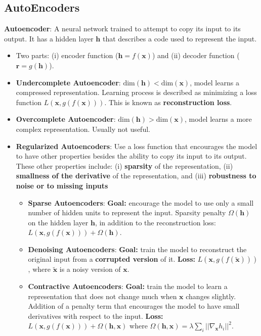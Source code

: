 \subsection*{AutoEncoders}
    \textbf{Autoencoder}: A neural network trained to attempt to copy its input to its output. It has a hidden layer $\mathbf{h}$ that describes a code used to represent the input.
\begin{itemize}
  \item Two parts: (i) encoder function ($\mathbf{h} = f(\mathbf{x})$) and (ii) decoder function ($\mathbf{r} = g(\mathbf{h})$).
  \item \textbf{Undercomplete Autoencoder}: $\text{dim}(\mathbf{h}) < \text{dim}(\mathbf{x})$, model learns a compressed representation. Learning process is described as minimizing a loss function $L(\mathbf{x}, g(f(\mathbf{x})))$. This is known as \textbf{reconstruction loss}.
  \item \textbf{Overcomplete Autoencoder}: $\text{dim}(\mathbf{h}) > \text{dim}(\mathbf{x})$, model learns a more complex representation. Usually not useful.
  \item \textbf{Regularized Autoencoders}: Use a loss function that encourages the model to have other properties besides the ability to copy its input to its output. These other properties include: (i) \textbf{sparsity} of the representation, (ii) \textbf{smallness of the derivative} of the representation, and (iii) \textbf{robustness to noise or to missing inputs}

    \begin{itemize}
      \item \textbf{Sparse Autoencoders}: \textbf{Goal:} encourage the model to use only a small number of hidden units to represent the input. Sparsity penalty $\Omega(\mathbf{h})$ on the hidden layer $\mathbf{h}$, in addition to the reconstruction loss: $L(\mathbf{x}, g(f(\mathbf{x}))) + \Omega(\mathbf{h})$.
      \item \textbf{Denoising Autoencoders}: \textbf{Goal:} train the model to reconstruct the original input from a \textbf{corrupted version} of it. \textbf{Loss:} $L(\mathbf{x}, g(f(\tilde{\mathbf{x}})))$, where $\tilde{\mathbf{x}}$ is a noisy version of $\mathbf{x}$.
      \item \textbf{Contractive Autoencoders}: \textbf{Goal:} train the model to learn a representation that does not change much when $\mathbf{x}$ changes slightly. Addition of a penalty term that encourages the model to have small derivatives with respect to the input. \textbf{Loss:} $L(\mathbf{x}, g(f(\mathbf{x}))) + \Omega (\mathbf{h}, \mathbf{x})$ where $\Omega(\mathbf{h}, \mathbf{x}) = \lambda \sum_i || \nabla_{\mathbf{x}} h_i ||^2$.
    \end{itemize}
\end{itemize}

